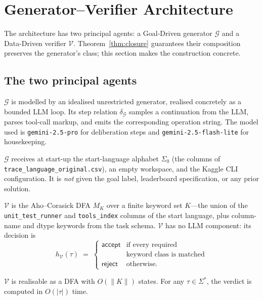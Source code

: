 \section{Generator--Verifier Architecture}
\label{sec:architecture}

The architecture has two principal agents: a Goal-Driven generator
$\mathcal{G}$ and a Data-Driven verifier $\mathcal{V}$.
Theorem~\ref{thm:closure} guarantees their composition preserves the
generator's class; this section makes the construction concrete.

\subsection{The two principal agents}

$\mathcal{G}$ is modelled by an idealised unrestricted generator,
realised concretely as a bounded LLM loop.  Its step relation
$\delta_\mathcal{G}$ samples a continuation from the LLM, parses
tool-call markup, and emits the corresponding operation string.
The model used is \texttt{gemini-2.5-pro} for deliberation steps and
\texttt{gemini-2.5-flash-lite} for housekeeping.

 $\mathcal{G}$ receives at start-up the start-language alphabet
$\Sigma_0$ (the columns of
\texttt{trace\_language\allowbreak \_original.csv}), an empty workspace,
and the Kaggle CLI configuration.  It is \emph{not} given the goal label,
leaderboard specification, or any prior solution.

$\mathcal{V}$ is the Aho--Corasick DFA $M_K$ over a finite keyword
set $K$---the union of the \texttt{unit\_test\_runner} and
\texttt{tools\_index} columns of the start language, plus column-name
and dtype keywords from the task schema.  $\mathcal{V}$ has no LLM
component: its decision is
\[
h_\mathcal{V}(\tau) \;=\;
\begin{cases}
\mathsf{accept} & \text{if every required}\\
                 & \text{keyword class is matched} \\
\mathsf{reject} & \text{otherwise.}
\end{cases}
\]

\begin{proposition}
\label{prop:verifier-dfa}
$\mathcal{V}$ is realisable as a DFA with $O(\|K\|)$ states.  For
any $\tau\in\Sigma^*$, the verdict is computed in $O(|\tau|)$ time.
\end{proposition}

